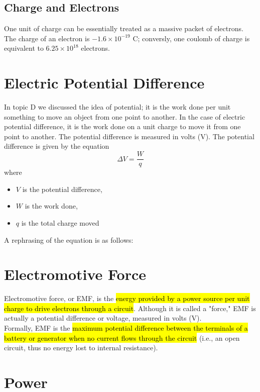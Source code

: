 \documentclass[a4paper,12pt]{article}
\let\oldsection\section
\renewcommand\section{\clearpage\oldsection}
\newcommand{\lb}{\\[8pt]}
\begin{document}
\subsection{Charge and Electrons}

One unit of charge can be essentially treated as a massive packet of electrons.\lb
The charge of an electron is $-1.6 \times 10^{-19}$ C; conversly, one coulomb of charge is equivalent to $6.25 \times 10^{18}$ electrons.


\section{Electric Potential Difference}

In topic D we discussed the idea of potential; it is the work done per unit something to move an object from one point to another. In the case of electric potential difference, it is the work done on a unit charge to move it from one point to another. The potential difference is measured in volts (V). The potential difference is given by the equation $$\Delta V = \frac{W}{q}$$where
\begin{itemize}
  \item $V$ is the potential difference,
  \item $W$ is the work done,
  \item $q$ is the total charge moved
\end{itemize}
A rephrasing of the equation is as follows:
\begin{center}
\end{center}

\section{Electromotive Force}

Electromotive force, or EMF, is the \hl{energy provided by a power source per unit charge to drive electrons through a circuit}. Although it is called a "force," EMF is actually a potential difference or voltage, measured in volts (V).\lb
Formally, EMF is the \hl{maximum potential difference between the terminals of a battery or generator when no current flows through the circuit} (i.e., an open circuit, thus no energy lost to internal resistance).\lb


\section{Power}
\end{document}
